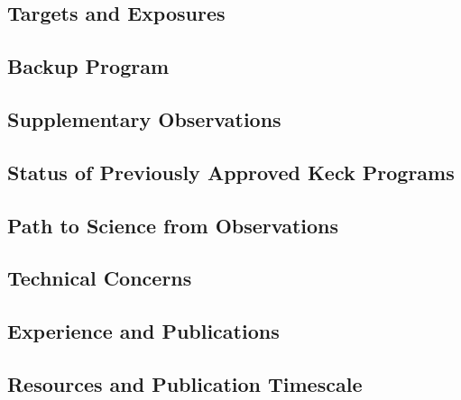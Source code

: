 \documentclass[11pt,preprint]{aastex}
\begin{document}
\subsection{Targets and Exposures}

\subsection{Backup Program}

\subsection{Supplementary Observations}

\subsection{Status of Previously Approved Keck Programs}



\subsection{Path to Science from Observations}

\subsection{Technical Concerns}

\subsection{Experience and Publications}

\subsection{Resources and Publication Timescale}
\end{document}

